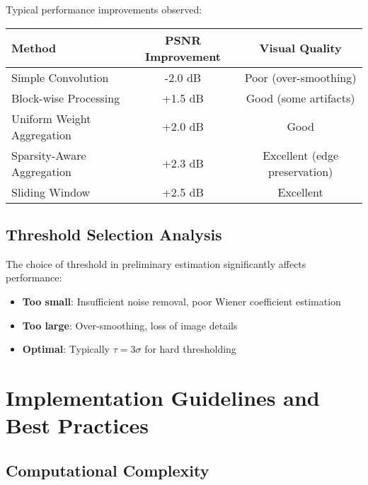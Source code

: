 \documentclass[12pt]{article}
\theoremstyle{definition}
\begin{document}
Typical performance improvements observed:

\begin{center}
    \begin{tabular}{@{}lcc@{}}
        \toprule
        Method                     & PSNR Improvement & Visual Quality                \\
        \midrule
        Simple Convolution         & -2.0 dB          & Poor (over-smoothing)         \\
        Block-wise Processing      & +1.5 dB          & Good (some artifacts)         \\
        Uniform Weight Aggregation & +2.0 dB          & Good                          \\
        Sparsity-Aware Aggregation & +2.3 dB          & Excellent (edge preservation) \\
        Sliding Window             & +2.5 dB          & Excellent                     \\
        \bottomrule
    \end{tabular}
\end{center}

\subsection{Threshold Selection Analysis}
\label{subsec:threshold_analysis}

The choice of threshold in preliminary estimation significantly affects performance:

\begin{itemize}[leftmargin=*]
    \item \textbf{Too small}: Insufficient noise removal, poor Wiener coefficient estimation
    \item \textbf{Too large}: Over-smoothing, loss of image details
    \item \textbf{Optimal}: Typically $\tau = 3\sigma$ for hard thresholding
\end{itemize}

\newpage


\section{Implementation Guidelines and Best Practices}
\label{sec:implementation}

\subsection{Computational Complexity}
\label{subsec:computational_complexity}
\end{document}
